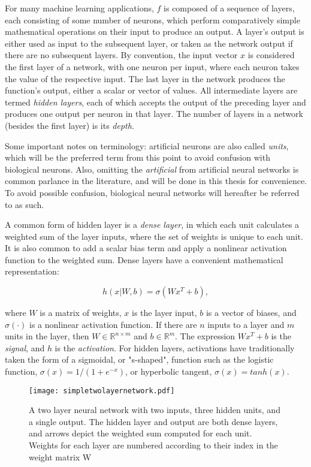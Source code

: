 For many machine learning applications, $f$ is composed of a sequence of layers, each consisting of some number of neurons, which perform comparatively simple mathematical operations on their input to produce an output.
A layer's output is either used as input to the subsequent layer, or taken as the network output if there are no subsequent layers.
By convention, the input vector $x$ is considered the first layer of a network, with one neuron per input, where each neuron takes the value of the respective input.
The last layer in the network produces the function's output, either a scalar or vector of values.
All intermediate layers are termed \textit{hidden layers}, each of which accepts the output of the preceding layer and produces one output per neuron in that layer.
The number of layers in a network (besides the first layer) is its \textit{depth}.

Some important notes on terminology: artificial neurons are also called \textit{units}, which will be the preferred term from this point to avoid confusion with biological neurons. Also, omitting the \textit{artificial} from artificial neural networks is common parlance in the literature, and will be done in this thesis for convenience. To avoid possible confusion, biological neural networks will hereafter be referred to as such.

A common form of hidden layer is a \textit{dense layer}, in which each unit calculates a weighted sum of the layer inputs, where the set of weights is unique to each unit.
It is also common to add a scalar bias term and apply a nonlinear activation function to the weighted sum.
Dense layers have a convenient mathematical representation:

\begin{equation}
h(x|W, b)=\sigma(W x^T + b),
\label{eq:denselayer}
\end{equation}

\noindent
where $W$ is a matrix of weights, $x$ is the layer input, $b$ is a vector of biases, and $\sigma(\cdot)$ is a nonlinear activation function.
If there are $n$ inputs to a layer and $m$ units in the layer, then $W\in\mathbb{R}^{n \times m}$ and $b\in\mathbb{R}^{m}$.
The expression $W x^T + b$ is the \textit{signal}, and $h$ is the \textit{activation}.
For hidden layers, activations have traditionally taken the form of a sigmoidal, or "s-shaped", function such as the logistic function, $\sigma(x) = 1/(1+e^{-x})$, or hyperbolic tangent, $\sigma(x) = tanh(x)$.

\begin{figure}
	\centering
	\texttt{[image: simpletwolayernetwork.pdf]}
	\caption{A two layer neural network with two inputs, three hidden units, and a single output. The hidden layer and output are both dense layers, and arrows depict the weighted sum computed for each unit. Weights for each layer are numbered according to their index in the weight matrix W}
	\label{fig:twolayernetwork}
\end{figure}


